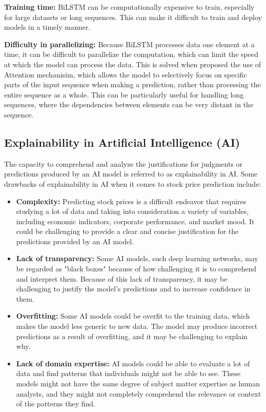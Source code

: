 \documentclass[a4paper]{article}
\begin{document}
\textbf{Training time:} BiLSTM can be computationally expensive to train, especially for large datasets or long sequences. This can make it difficult to train and deploy models in a timely manner.

\textbf{Difficulty in parallelizing:} Because BiLSTM processes data one element at a time, it can be difficult to parallelize the computation, which can limit the speed at which the model can process the data. This is solved when \cite{vaswani2017attention} proposed the use of Attention mechanisim, which allows the model to selectively focus on specific parts of the input sequence when making a prediction, rather than processing the entire sequence as a whole. This can be particularly useful for handling long sequences, where the dependencies between elements can be very distant in the sequence.
\subsection{Explainability in Artificial Intelligence (AI)}
The capacity to comprehend and analyze the justifications for judgments or predictions produced by an AI model is referred to as explainability in AI. Some drawbacks of explainability in AI when it comes to stock price prediction include:
\begin{itemize}[leftmargin=7.5pt]
    \item \textbf{Complexity:} Predicting stock prices is a difficult endeavor that requires studying a lot of data and taking into consideration a variety of variables, including economic indicators, corporate performance, and market mood. It could be challenging to provide a clear and concise justification for the predictions provided by an AI model.
    \item \textbf{Lack of transparency:} Some AI models, such deep learning networks, may be regarded as "black boxes" because of how challenging it is to comprehend and interpret them. Because of this lack of transparency, it may be challenging to justify the model's predictions and to increase confidence in them.
    \item \textbf{Overfitting:} Some AI models could be overfit to the training data, which makes the model less generic to new data. The model may produce incorrect predictions as a result of overfitting, and it may be challenging to explain why.
    \item \textbf{Lack of domain expertise:} AI models could be able to evaluate a lot of data and find patterns that individuals might not be able to see. These models might not have the same degree of subject matter expertise as human analysts, and they might not completely comprehend the relevance or context of the patterns they find.
\end{itemize}
\end{document}
